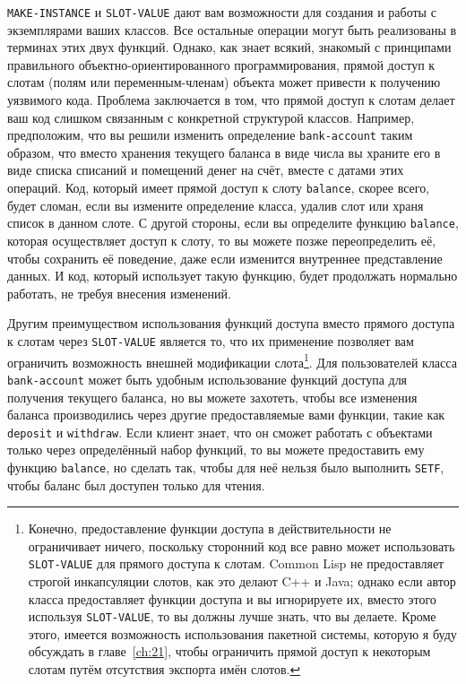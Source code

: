 \lstinline{MAKE-INSTANCE} и \lstinline{SLOT-VALUE} дают вам возможности для создания и работы с
эк\-земпля\-ра\-ми ваших классов.  Все остальные операции могут быть реализованы в терминах этих
двух функций.  Однако, как знает всякий, знакомый с принципами правильного
объектно-ориентированного программирования, прямой доступ к слотам (полям или
переменным-членам) объекта может привести к получению уязвимого кода.  Проблема
заключается в том, что прямой доступ к слотам делает ваш код слишком связанным с
конкретной структурой классов.  Например, предположим, что вы решили изменить определение
\lstinline{bank-account} таким образом, что вместо хранения текущего баланса в виде числа вы
храните его в виде списка списаний и помещений денег на счёт, вместе с датами этих
операций.  Код, который имеет прямой доступ к слоту \lstinline{balance}, скорее всего, будет
сломан, если вы измените определение класса, удалив слот или храня список в данном
слоте. С другой стороны, если вы определите функцию \lstinline{balance}, которая осуществляет
доступ к слоту, то вы можете позже переопределить её, чтобы сохранить её поведение, даже
если изменится внутреннее представление данных.  И код, который использует такую функцию,
будет продолжать нормально работать, не требуя внесения изменений.

Другим преимуществом использования функций доступа вместо прямого доступа к слотам через
\lstinline{SLOT-VALUE} является то, что их применение позволяет вам ограничить возможность
внешней модификации слота\footnote{Конечно, предоставление функции доступа в
  действительности не ограничивает ничего, поскольку сторонний код все равно может
  использовать \lstinline{SLOT-VALUE} для прямого доступа к слотам. Common Lisp не
  предоставляет строгой инкапсуляции слотов, как это делают C++ и Java; однако если автор
  класса предоставляет функции доступа и вы игнорируете их, вместо этого используя
  \lstinline{SLOT-VALUE}, то вы должны лучше знать, что вы делаете.  Кроме этого, имеется
  возможность использования пакетной системы, которую я буду обсуждать в
  главе~\ref{ch:21}, чтобы ограничить прямой доступ к некоторым слотам путём отсутствия
экспорта имён слотов.}. Для пользователей класса \lstinline{bank-account} может быть удобным
использование функций доступа для получения текущего баланса, но вы можете захотеть, чтобы
все изменения баланса производились через другие предоставляемые вами функции, такие как
\lstinline{deposit} и \lstinline{withdraw}.  Если клиент знает, что он сможет работать с объектами
только через определённый набор функций, то вы можете предоставить ему функцию
\lstinline{balance}, но сделать так, чтобы для неё нельзя было выполнить \lstinline{SETF}, чтобы
баланс был доступен только для чтения.

